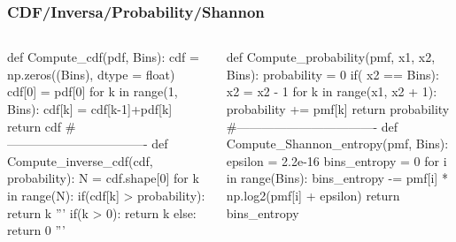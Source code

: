     \begin{frame}[fragile]
    \frametitle{CDF/Inversa/Probability/Shannon}
    \begin{columns}

    \begin{roundedcodebox}
    \begin{python}
def Compute_cdf(pdf, Bins):
    cdf = np.zeros((Bins), dtype = float)
    cdf[0] = pdf[0]
    for k in range(1, Bins):   
        cdf[k] = cdf[k-1]+pdf[k]
    return cdf  
#----------------------------------
def Compute_inverse_cdf(cdf, probability):
    N = cdf.shape[0]          
    for k in range(N): 
        if(cdf[k] > probability):
            return k
            '''
            if(k > 0):
                return k
            else:
                return 0  
            ''' 
     \end{python}
\end{roundedcodebox}
    \begin{roundedcodebox}
    \begin{python}  
def Compute_probability(pmf, x1, x2, Bins): 
    probability = 0
    if( x2 == Bins):
        x2 = x2 - 1
    for k in range(x1, x2 + 1):
        probability += pmf[k]
    return probability   
#----------------------------------
def Compute_Shannon_entropy(pmf, Bins):
    epsilon = 2.2e-16
    bins_entropy = 0
    for i in range(Bins):
        bins_entropy -= pmf[i] * np.log2(pmf[i] + epsilon)
    return bins_entropy
\end{python}
\end{roundedcodebox}
    \end{columns}
\end{frame}

 




